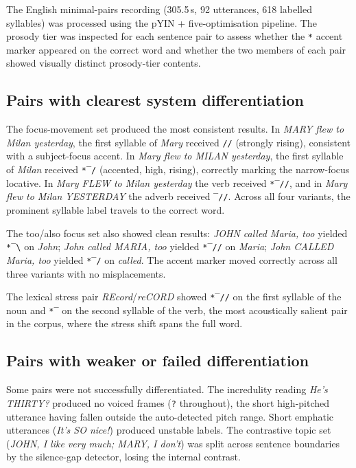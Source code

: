 The English minimal-pairs recording (305.5\,s, 92 utterances, 618 labelled
syllables) was processed using the pYIN + five-optimisation pipeline. The
prosody tier was inspected for each sentence pair to assess whether the
\texttt{*} accent marker appeared on the correct word and whether the two
members of each pair showed visually distinct prosody-tier contents.

\subsection{Pairs with clearest system differentiation}

The focus-movement set produced the most consistent results. In \textit{MARY
flew to Milan yesterday}, the first syllable of \textit{Mary} received
\texttt{//} (strongly rising), consistent with a subject-focus accent. In
\textit{Mary flew to MILAN yesterday}, the first syllable of \textit{Milan}
received \texttt{*‾/} (accented, high, rising), correctly marking the
narrow-focus locative. In \textit{Mary FLEW to Milan yesterday} the verb
received \texttt{*‾//}, and in \textit{Mary flew to Milan YESTERDAY} the
adverb received \texttt{‾//}. Across all four variants, the prominent
syllable label travels to the correct word.

The too/also focus set also showed clean results: \textit{JOHN called Maria,
too} yielded \texttt{*‾\textbackslash} on \textit{John}; \textit{John called
MARIA, too} yielded \texttt{*‾//} on \textit{Maria}; \textit{John CALLED
Maria, too} yielded \texttt{*‾/} on \textit{called}. The accent marker moved
correctly across all three variants with no misplacements.

The lexical stress pair \textit{REcord}/\textit{reCORD} showed \texttt{*‾//}
on the first syllable of the noun and \texttt{*‾} on the second syllable of
the verb, the most acoustically salient pair in the corpus, where the
stress shift spans the full word.

\subsection{Pairs with weaker or failed differentiation}

Some pairs were not successfully differentiated. The incredulity reading
\textit{He's THIRTY?} produced no voiced frames (\texttt{?} throughout), the
short high-pitched utterance having fallen outside the auto-detected pitch
range. Short emphatic utterances (\textit{It's SO nice!}) produced unstable
labels. The contrastive topic set (\textit{JOHN, I like very much; MARY, I
don't}) was split across sentence boundaries by the silence-gap detector,
losing the internal contrast.

